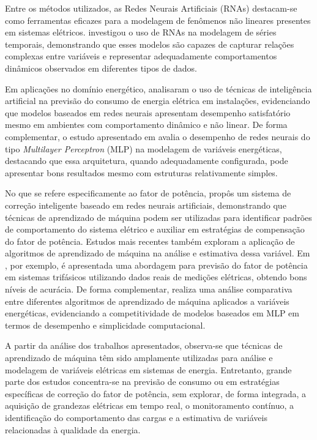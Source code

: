 Entre os métodos utilizados, as Redes Neurais Artificiais (RNAs) destacam-se como ferramentas eficazes para a modelagem de fenômenos não lineares presentes em sistemas elétricos.  investigou o uso de RNAs na modelagem de séries temporais, demonstrando que esses modelos são capazes de capturar relações complexas entre variáveis e representar adequadamente comportamentos dinâmicos observados em diferentes tipos de dados.

Em aplicações no domínio energético,  analisaram o uso de técnicas de inteligência artificial na previsão do consumo de energia elétrica em instalações, evidenciando que modelos baseados em redes neurais apresentam desempenho satisfatório mesmo em ambientes com comportamento dinâmico e não linear. De forma complementar, o estudo apresentado em  avalia o desempenho de redes neurais do tipo \textit{Multilayer Perceptron} (MLP) na modelagem de variáveis energéticas, destacando que essa arquitetura, quando adequadamente configurada, pode apresentar bons resultados mesmo com estruturas relativamente simples.

No que se refere especificamente ao fator de potência,  propôs um sistema de correção inteligente baseado em redes neurais artificiais, demonstrando que técnicas de aprendizado de máquina podem ser utilizadas para identificar padrões de comportamento do sistema elétrico e auxiliar em estratégias de compensação do fator de potência. Estudos mais recentes também exploram a aplicação de algoritmos de aprendizado de máquina na análise e estimativa dessa variável. Em , por exemplo, é apresentada uma abordagem para previsão do fator de potência em sistemas trifásicos utilizando dados reais de medições elétricas, obtendo bons níveis de acurácia. De forma complementar,  realiza uma análise comparativa entre diferentes algoritmos de aprendizado de máquina aplicados a variáveis energéticas, evidenciando a competitividade de modelos baseados em MLP em termos de desempenho e simplicidade computacional.

A partir da análise dos trabalhos apresentados, observa-se que técnicas de aprendizado de máquina têm sido amplamente utilizadas para análise e modelagem de variáveis elétricas em sistemas de energia. Entretanto, grande parte dos estudos concentra-se na previsão de consumo ou em estratégias específicas de correção do fator de potência, sem explorar, de forma integrada, a aquisição de grandezas elétricas em tempo real, o monitoramento contínuo, a identificação do comportamento das cargas e a estimativa de variáveis relacionadas à qualidade da energia.

